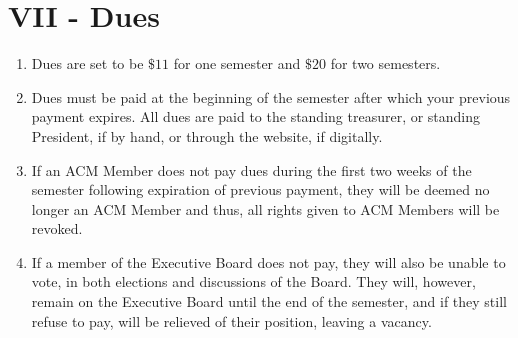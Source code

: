
\section{VII - Dues}
\begin{enumerate}
  \item	Dues are set to be $\$11$ for one semester and $\$20$ for two semesters.
  \item	Dues must be paid at the beginning of the semester after which your
  previous payment expires. All dues are paid to the standing treasurer, or
  standing President, if by hand, or
  through the website, if digitally.
  \item If an ACM Member does not pay dues during the first two weeks of the
  semester following expiration of previous payment, they will be deemed no
  longer an ACM Member and thus, all rights given to ACM Members will be
  revoked.
  \item If a member of the Executive Board does not pay, they will also be unable to
  vote, in both elections and discussions of the Board. They will, however,
  remain on the Executive Board until the end of the semester, and if they still
  refuse to pay, will be relieved of their position, leaving a vacancy.
\end{enumerate}

